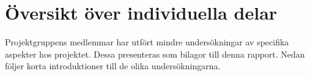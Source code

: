 \chapter{Översikt över individuella delar}
Projektgruppens medlemmar har utfört mindre undersökningar av specifika aspekter hos projektet. Dessa presenteras som bilagor till denna rapport. Nedan följer korta introduktioner till de olika undersökningarna.

\subsection*{}

\subsection*{}

\subsection*{}

\subsection*{}

\subsection*{}

\subsection*{}

\subsection*{}

\subsection*{}
